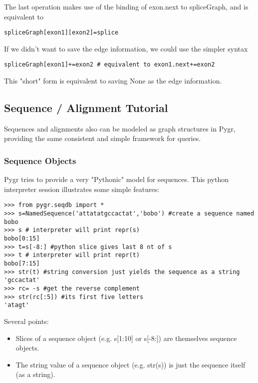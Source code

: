\documentclass{howto}
\begin{document}
The last operation makes use of the binding of exon.next to spliceGraph, and is equivalent to

\begin{verbatim}
spliceGraph[exon1][exon2]=splice
\end{verbatim}

If we didn't want to save the edge information, we could use the simpler syntax

\begin{verbatim}
spliceGraph[exon1]+=exon2 # equivalent to exon1.next+=exon2
\end{verbatim}

This "short" form is equivalent to saving None as the edge information.


\subsection{Sequence / Alignment Tutorial}
\label{seq-align}

Sequences and alignments also can be modeled as graph structures in Pygr, providing the same consistent and simple framework for queries.

\subsubsection{Sequence Objects}
Pygr tries to provide a very "Pythonic" model for sequences.  This python interpreter session illustrates some simple features:

\begin{verbatim}
>>> from pygr.seqdb import *
>>> s=NamedSequence('attatatgccactat','bobo') #create a sequence named bobo
>>> s # interpreter will print repr(s)
bobo[0:15]
>>> t=s[-8:] #python slice gives last 8 nt of s
>>> t # interpreter will print repr(t)
bobo[7:15]
>>> str(t) #string conversion just yields the sequence as a string 
'gccactat'
>>> rc= -s #get the reverse complement
>>> str(rc[:5]) #its first five letters
'atagt'
\end{verbatim}

Several points:
\begin{itemize}

\item
   Slices of a sequence object (e.g. s[1:10] or s[-8:]) are themselves sequence objects.

\item    
The string value of a sequence object (e.g. str(s)) is just the sequence itself (as a string).

\end{itemize}
\end{document}
